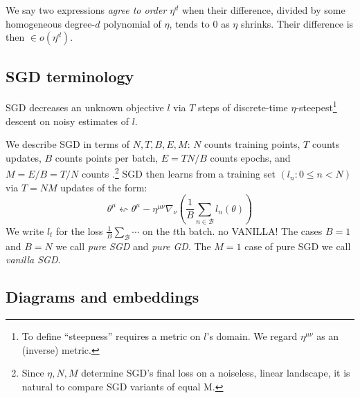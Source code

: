 \documentclass{article}
\theoremstyle{plain}
\theoremstyle{definition}
\newcommand{\wrap}[1]{\left(#1\right)}
\newcommand{\Bb}{\mathcal{B}}
\begin{document}
        We say two expressions \emph{agree to order $\eta^d$} when their
        difference, divided by some homogeneous degree-$d$ polynomial of
        $\eta$, tends to $0$ as $\eta$ shrinks.  Their difference is then $\in
        o(\eta^d)$.
        

    \subsection{SGD terminology}
        SGD decreases an unknown objective $l$ via $T$ steps of discrete-time
        $\eta$-steepest\footnote{
            To define ``steepness'' requires a metric on $l$'s domain.  We
            regard $\eta^{\mu\nu}$ as an (inverse) metric.
        } descent on noisy estimates of $l$.

        We describe SGD in terms of $N,T,B,E,M$:
            $N$ counts training points,
            $T$ counts updates,
            $B$ counts points per batch,
            $E=TN/B$ counts epochs, 
            and $M=E/B=T/N$ counts .\footnote{
                Since $\eta,N,M$ determine SGD's final loss on a noiseless,
                linear landscape, it is natural to compare SGD variants of
                equal M.
            }
        SGD then learns from a training set $(l_n: 0\leq n<N)$ via $T=NM$
        updates of the form:
        $$
            \theta^\mu
            \leftsquigarrow
            \theta^\mu -
            \eta^{\mu\nu} \nabla_\nu
                \wrap{\frac{1}{B} \sum_{n\in \Bb} l_n(\theta)}
        $$
        We write $l_t$ for the loss $\frac{1}{B}\sum_\Bb\cdots$ on the $t$th
        batch. 
        {\color{red} no VANILLA!}  
        The cases $B=1$ and $B=N$ we call \emph{pure SGD} and \emph{pure GD}.
        The $M=1$ case of pure SGD we call \emph{vanilla SGD}.


    \subsection{Diagrams and embeddings}
\end{document}
